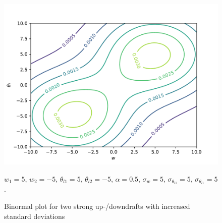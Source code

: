 \documentclass[10pt]{beamer}
\numberwithin{equation}{section}
\begin{document}
    \begin{frame}
        \begin{figure}[!htb]
            \centering
            \includegraphics[width=.5\textwidth]{include/figures/plot2}
            \caption{Binormal plot for two strong up-/downdrafts with increased standard deviations}
            \label{fig:plot2}
            $w_1 = 5$, $w_2 = -5$, $\theta_{l1} = 5$, $\theta_{l2} = -5$,
            $\alpha = 0.5$, $\sigma_w = 5$, $\sigma_{\theta_{l1}} = 5$, $\sigma_{\theta_{l1}} = 5$.
        \end{figure}
    \end{frame}
\end{document}
